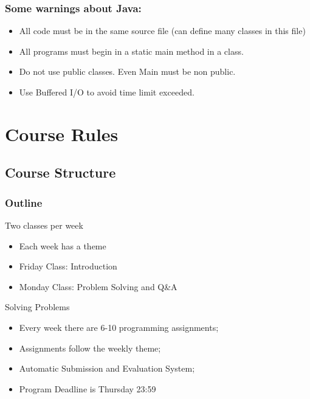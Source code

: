 \documentclass{beamer}
\begin{document}
\begin{frame}
  \frametitle{Some warnings about Java:}

  \begin{itemize}
  \item All code must be in the same source file (can define many
    classes in this file)

    \medskip

  \item All programs must begin in a static main method in a
     class.

    \medskip

  \item Do not use public classes. Even Main must be non public.

    \medskip

  \item Use Buffered I/O to avoid time limit exceeded.
  \end{itemize}
\end{frame}

\section{Course Rules}
\subsection{Course Structure}

\begin{frame}
    \frametitle{Outline}
    
    \begin{block}{Two classes per week}
        \begin{itemize}   
        \item Each week has a theme
        \item Friday Class: Introduction
        \item Monday Class: Problem Solving and Q\&A
        \end{itemize}
    \end{block}
    
    \begin{block}{Solving Problems}
        \begin{itemize}
        \item Every week there are 6-10 programming assignments;
        \item Assignments follow the weekly theme;
        \item Automatic Submission and Evaluation System;
        \item Program Deadline is Thursday 23:59
        \end{itemize}
    \end{block}
\end{frame}
    
\end{document}
